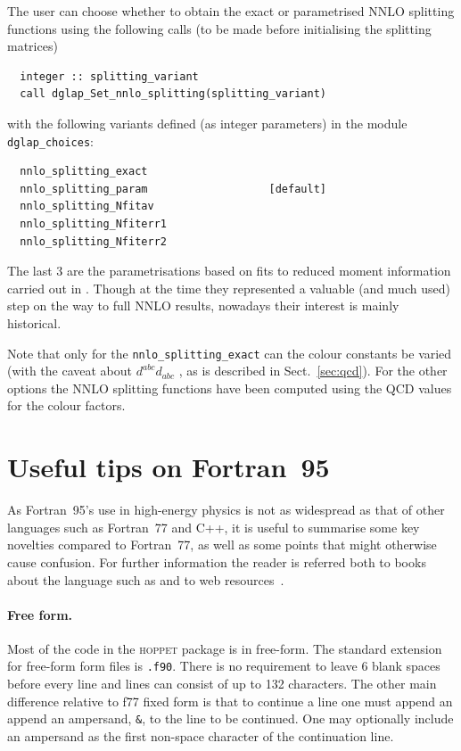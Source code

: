 \documentclass[12pt]{article}
\newcommand{\hoppet}{\textsc{hoppet}\xspace}
\newcommand{\ttt}[1]{\texttt{#1}}
\begin{document}
The user can choose whether to obtain the exact or parametrised NNLO
splitting functions using the following calls (to be made before
initialising the splitting matrices)
\begin{lstlisting}
  integer :: splitting_variant
  call dglap_Set_nnlo_splitting(splitting_variant)
\end{lstlisting}
with the following variants defined (as integer parameters) in the
module \ttt{dglap\_choices}:
\begin{lstlisting}
  nnlo_splitting_exact
  nnlo_splitting_param                   [default]
  nnlo_splitting_Nfitav
  nnlo_splitting_Nfiterr1
  nnlo_splitting_Nfiterr2
\end{lstlisting}
The last 3 are the parametrisations based on fits to reduced moment
information carried out in \cite{vanNeerven:1999ca,vanNeerven:2000uj}.
Though at the time they represented a valuable (and much used) step on
the way to full NNLO results, nowadays their interest is mainly
historical.

Note that only for the \ttt{nnlo\_splitting\_exact} can the colour
constants be varied (with the caveat about $d^{abc}d_{abc}$ , as is
described in Sect.~\ref{sec:qcd}). For the other options the
NNLO splitting functions have been computed using the QCD values
for the colour factors.

\section{Useful tips on Fortran~95}
\label{sec:f95appendix}

As Fortran~95's use in high-energy physics is not as widespread as
that of other languages such as Fortran~77 and C++, it is useful to
summarise some key novelties compared to Fortran~77, as well as some
points that might otherwise cause confusion. For further information
the reader is referred both to books about the language such as
\cite{F95Explained} and to web resources~\cite{F95WebResources}.

\paragraph{Free form.}  Most of the code in the \hoppet package is in
free-form. The standard extension for free-form form files is
\ttt{.f90}. There is no requirement to leave 6 blank spaces before
every line and lines can consist of up to 132 characters. The other
main difference relative to f77 fixed form is that to continue a line
one must append an append an ampersand, \ttt{\&}, to the line to be
continued. One may optionally include an ampersand as the first
non-space character of the continuation line.
\end{document}
